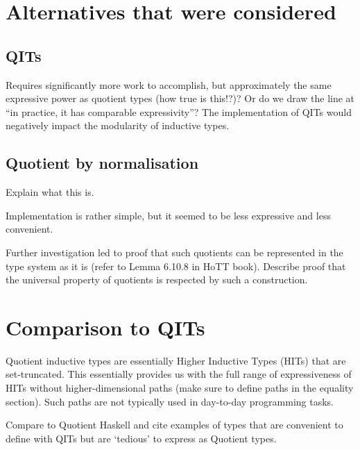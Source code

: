 \documentclass[11pt]{article}
\begin{document}
\section{Alternatives that were considered}
\subsection{QITs}
Requires significantly more work to accomplish, but approximately the same expressive power as quotient types (how true is this!?)? Or do we draw the line at ``in practice, it has comparable expressivity''?
The implementation of QITs would negatively impact the modularity of inductive types.

\subsection{Quotient by normalisation}
Explain what this is.

Implementation is rather simple, but it seemed to be less expressive and less convenient.

Further investigation led to proof that such quotients can be represented in the type system as it is (refer to Lemma 6.10.8 in HoTT book). Describe proof that the universal property of quotients is respected by such a construction.

\section{Comparison to QITs}
Quotient inductive types are essentially Higher Inductive Types (HITs) that are set-truncated. This essentially provides us with the full range of expressiveness of HITs without higher-dimensional paths (make sure to define paths in the equality section). Such paths are not typically used in day-to-day programming tasks.

Compare to Quotient Haskell and cite examples of types that are convenient to define with QITs but are `tedious' to express as Quotient types.
\end{document}
